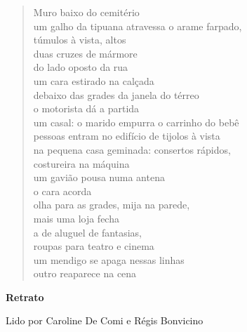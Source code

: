 \begin{verse}
Muro baixo do cemitério\\
um galho da tipuana atravessa o arame farpado,\\
túmulos à vista, altos\\
duas cruzes de mármore\\[5pt]
do lado oposto da rua\\
um cara estirado na calçada\\
debaixo das grades da janela do térreo\\
o motorista dá a partida\\[5pt]
um casal: o marido empurra o carrinho do bebê\\
pessoas entram no edifício de tijolos à vista\\
na pequena casa geminada: consertos rápidos,\\
costureira na máquina\\[5pt]
um gavião pousa numa antena\\
o cara acorda\\
olha para as grades, mija na parede,\\
mais uma loja fecha\\[5pt]
a de aluguel de fantasias,\\
roupas para teatro e cinema\\
um mendigo se apaga nessas linhas\\
outro reaparece na cena
\end{verse}

\pagebreak

\textbf{Retrato}

Lido por Caroline De Comi e Régis Bonvicino

